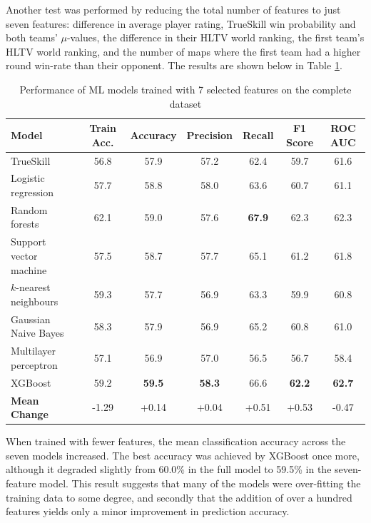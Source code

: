 Another test was performed by reducing the total number of features to just seven features: difference in average player rating, TrueSkill win probability and both teams' $\mu$-values, the difference in their HLTV world ranking, the first team's HLTV world ranking, and the number of maps where the first team had a higher round win-rate than their opponent. The results are shown below in Table \ref{table:7features}.

\begin{table}[h!]
	\centering
	\small
	\begin{adjustbox}{center} %
		\begin{tabular}{ |l|c|c|c|c|c|c| }
			\hline
			\rule{0pt}{2.6ex} \textbf{Model} & \textbf{Train Acc.} & \textbf{Accuracy} & \textbf{Precision} & \textbf{Recall} & \textbf{F1 Score} & \textbf{ROC AUC} \\
			\hline
			\rule{0pt}{2.6ex} TrueSkill                 & 56.8 & 57.9 & 57.2 & 62.4 & 59.7 & 61.6 \\ \hline
			\rule{0pt}{2.6ex} Logistic regression 		& 57.7 & 58.8 & 58.0 & 63.6 & 60.7 & 61.1 \\
			\rule{0pt}{2.6ex} Random forests			& 62.1 & 59.0 & 57.6 & \textbf{67.9} & 62.3 & 62.3 \\
			\rule{0pt}{2.6ex} Support vector machine 	& 57.5 & 58.7 & 57.7 & 65.1 & 61.2 & 61.8 \\
			\rule{0pt}{2.6ex} $k$-nearest neighbours 	& 59.3 & 57.7 & 56.9 & 63.3 & 59.9 & 60.8 \\
			\rule{0pt}{2.6ex} Gaussian Naive Bayes 		& 58.3 & 57.9 & 56.9 & 65.2 & 60.8 & 61.0 \\
			\rule{0pt}{2.6ex} Multilayer perceptron     & 57.1 & 56.9 & 57.0 & 56.5 & 56.7 & 58.4 \\
			\rule{0pt}{2.6ex} XGBoost 					& 59.2 & \textbf{59.5} & \textbf{58.3} & 66.6 & \textbf{62.2} & \textbf{62.7} \\
			\hline
			\rule{0pt}{2.6ex} \textbf{Mean Change} 		& -1.29 & +0.14 & +0.04 & +0.51 & +0.53 & -0.47 \\
			\hline
		\end{tabular}
	\end{adjustbox}
	\caption{Performance of ML models trained with 7 selected features on the complete dataset}
	\label{table:7features}
\end{table}

When trained with fewer features, the mean classification accuracy across the seven models increased. The best accuracy was achieved by XGBoost once more, although it degraded slightly from 60.0\% in the full model to 59.5\% in the seven-feature model. This result suggests that many of the models were over-fitting the training data to some degree, and secondly that the addition of over a hundred features yields only a minor improvement in prediction accuracy.

